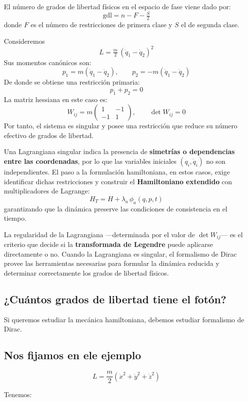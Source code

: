 \documentclass{article}
\begin{document}
El número de grados de libertad físicos en el espacio de fase viene dado por:
\[
\boxed{ \text{gdl} = n - F - \tfrac{S}{2} }
\]
donde \(F\) es el número de restricciones de primera clase y \(S\) el de segunda clase.


Consideremos
\[
L = \tfrac{m}{2}\,(\dot q_1 - \dot q_2)^2
\]
Sus momentos canónicos son:
\[
p_1 = m(\dot q_1 - \dot q_2),
\qquad
p_2 = -m(\dot q_1 - \dot q_2)
\]
De donde se obtiene una restricción primaria:
\[
p_1 + p_2 = 0
\]
La matriz hessiana en este caso es:
\[
W_{ij} = m
\begin{pmatrix}
1 & -1\\[3pt]
-1 & 1
\end{pmatrix},
\qquad
\det W_{ij} = 0
\]
Por tanto, el sistema es singular y posee una restricción que reduce su número efectivo de grados de libertad.


Una Lagrangiana singular indica la presencia de \textbf{simetrías o dependencias entre las coordenadas},
por lo que las variables iniciales \((q_i, \dot q_i)\) no son independientes.
El paso a la formulación hamiltoniana, en estos casos, exige identificar dichas restricciones
y construir el \textbf{Hamiltoniano extendido} con multiplicadores de Lagrange:
\[
H_T = H + \lambda_a\,\phi_a(q,p,t)
\]
garantizando que la dinámica preserve las condiciones de consistencia en el tiempo.


La regularidad de la Lagrangiana —determinada por el valor de \(\det W_{ij}\)— 
es el criterio que decide si la \textbf{transformada de Legendre} puede aplicarse directamente o no.
Cuando la Lagrangiana es singular, el formalismo de Dirac provee las herramientas necesarias
para formular la dinámica reducida y determinar correctamente los grados de libertad físicos.


\subsection{¿Cuántos grados de libertad tiene el fotón?}

Si queremos estudiar la mecánica hamiltoniana, debemos estudiar formalismo de Dirac.

\subsection{Nos fijamos en ele ejemplo}


\[ L = \frac{m}{2} \left(  \dot{x}^{2} +  \dot{y}^{2} +  \dot{z}^{2} \right) \]

Tenemos:
\end{document}
